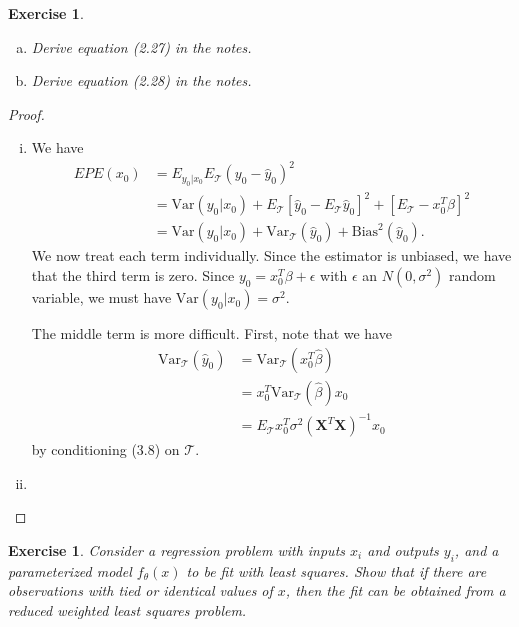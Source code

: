 \documentclass[12pt]{amsart}
\theoremstyle{plain}%
\newtheorem{exer}[thm]{Exercise}
\theoremstyle{definition}
\theoremstyle{remark}
\begin{document}
\begin{exer}
    \begin{enumerate}[(a)]
        \item Derive equation (2.27) in the notes.
        \item Derive equation (2.28) in the notes.
    \end{enumerate}
\end{exer}

\begin{proof}
    \begin{enumerate}[(i)]
        \item We have \begin{align*}
            EPE(x_0) &= E_{y_0 | x_0} E_{\mathcal{T}}(y_0 - \hat y_0)^2 \\
                     &= \text{Var}(y_0|x_0) + E_{\mathcal T}[\hat y_0 - E_{\mathcal T} \hat y_0]^2 + [E_{\mathcal T} - x_0^T \beta]^2 \\
                     &= \text{Var}(y_0 | x_0) + \text{Var}_\mathcal{T}(\hat y_0) + \text{Bias}^2(\hat y_0).
        \end{align*}  We now treat each term individually.  Since the estimator is unbiased, we have that the third term is zero.  Since $y_0 = x_0^T \beta + \epsilon$ with $\epsilon$ an $N(0,\sigma^2)$ random variable, we must have $\text{Var}(y_0|x_0) = \sigma^2$.  

        The middle term is more difficult.  First, note that we have \begin{align*}
            \text{Var}_{\mathcal T}(\hat y_0) &= \text{Var}_{\mathcal T}(x_0^T \hat \beta) \\
                    &= x_0^T \text{Var}_{\mathcal T}(\hat \beta) x_0 \\
                    &= E_{\mathcal T} x_0^T \sigma^2 (\mathbf{X}^T \mathbf{X})^{-1} x_0
            \end{align*} by conditioning (3.8) on $\mathcal T$.
        \item 
    \end{enumerate}
\end{proof}

\begin{exer}
    Consider a regression problem with inputs $x_i$ and outputs $y_i$, and a parameterized model $f_\theta(x)$ to be fit with least squares.  Show that if there are observations with \emph{tied} or \emph{identical} values of $x$, then the fit can be obtained from a reduced weighted least squares problem.
\end{exer}
\end{document}
